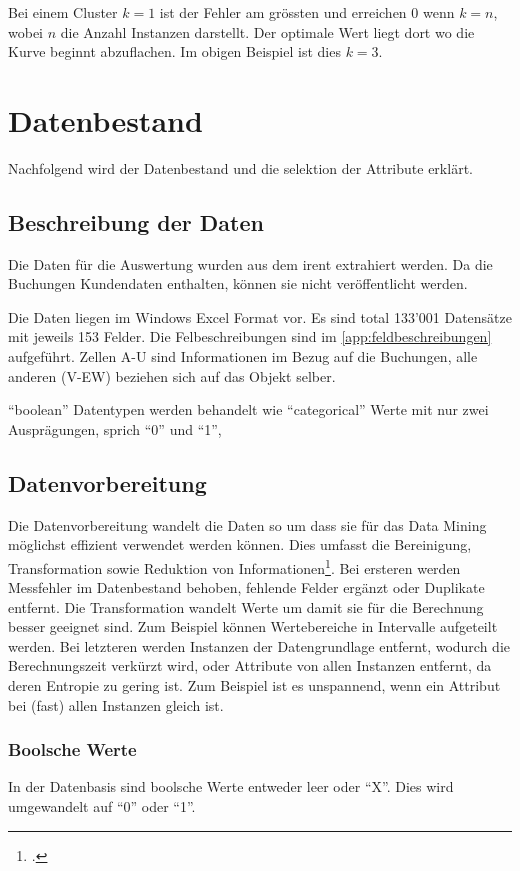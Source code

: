 Bei einem Cluster $k=1$ ist der Fehler am grössten und erreichen 0 wenn $k=n$, wobei $n$ die Anzahl Instanzen darstellt. Der optimale Wert liegt dort wo die Kurve beginnt abzuflachen. Im obigen Beispiel ist dies $k=3$.

\section{Datenbestand}
\label{sec:recherche:datenbestand}
Nachfolgend wird der Datenbestand und die selektion der Attribute erklärt.

\subsection{Beschreibung der Daten}
\label{sec:recherche:datenbeschaffung}
Die Daten für die Auswertung wurden aus dem \gls{irent} extrahiert werden. Da die Buchungen Kundendaten enthalten, können sie nicht veröffentlicht werden.

Die Daten liegen im Windows Excel Format vor. Es sind total 133'001 Datensätze mit jeweils 153 Felder. Die Felbeschreibungen sind im \cref{app:feldbeschreibungen} aufgeführt. Zellen A-U sind Informationen im Bezug auf die Buchungen, alle anderen (V-EW) beziehen sich auf das Objekt selber.

"`boolean"' Datentypen werden behandelt wie "`categorical"' Werte mit nur zwei Ausprägungen, sprich "`0"' und "`1"',

\subsection{Datenvorbereitung}
\label{sec:recherche:datenvorbereitung}
Die Datenvorbereitung wandelt die Daten so um dass sie für das Data Mining möglichst effizient verwendet werden können. Dies umfasst die Bereinigung, Transformation sowie Reduktion von Informationen\footcite{feature_selection_2017-01-04}. Bei ersteren werden Messfehler im Datenbestand behoben, fehlende Felder ergänzt oder Duplikate entfernt. Die Transformation wandelt Werte um damit sie für die Berechnung besser geeignet sind. Zum Beispiel können Wertebereiche in Intervalle aufgeteilt werden. Bei letzteren werden Instanzen der Datengrundlage entfernt, wodurch die Berechnungszeit verkürzt wird, oder Attribute von allen Instanzen entfernt, da deren Entropie zu gering ist. Zum Beispiel ist es unspannend, wenn ein Attribut bei (fast) allen Instanzen gleich ist. 

\subsubsection{Boolsche Werte}  
\label{sec:recherche:datenvorbereitung:boolschewerte}
In der Datenbasis sind boolsche Werte entweder leer oder "`X"'. Dies wird umgewandelt auf "`0"' oder "`1"'.

